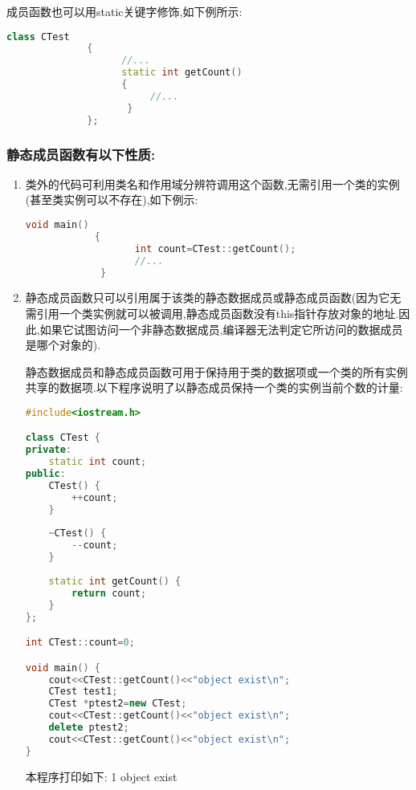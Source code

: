 \documentclass{article}
\begin{document}
成员函数也可以用static关键字修饰,如下例所示:
\begin{lstlisting}[language=c++]
              class CTest
              {
                    //...
                    static int getCount()
                    {
                         //...
                     }
              };
\end{lstlisting}
\subsubsection{静态成员函数有以下性质:}
\label{sec-2-3-1}

\begin{enumerate}
\item 类外的代码可利用类名和作用域分辨符调用这个函数,无需引用一个类的实例(甚至类实例可以不存在),如下例示:
\label{sec-2-3-1-1}
\begin{lstlisting}[language=c++]
            void main()
            {
                   int count=CTest::getCount();
                   //...
             }
\end{lstlisting}

\item 静态成员函数只可以引用属于该类的静态数据成员或静态成员函数(因为它无需引用一个类实例就可以被调用,静态成员函数没有this指针存放对象的地址.因此,如果它试图访问一个非静态数据成员,编译器无法判定它所访问的数据成员是哪个对象的).
\label{sec-2-3-1-2}

静态数据成员和静态成员函数可用于保持用于类的数据项或一个类的所有实例共享的数据项.以下程序说明了以静态成员保持一个类的实例当前个数的计量:
\begin{lstlisting}[language=c++]
#include<iostream.h>

class CTest {
private:
    static int count;
public:
    CTest() {    
        ++count;
    }
    
    ~CTest() {    
        --count;
    }
    
    static int getCount() {          
        return count;
    }
};

int CTest::count=0;

void main() {
    cout<<CTest::getCount()<<"object exist\n";
    CTest test1; 
    CTest *ptest2=new CTest;
    cout<<CTest::getCount()<<"object exist\n";
    delete ptest2;
    cout<<CTest::getCount()<<"object exist\n";
}
\end{lstlisting}
本程序打印如下:
          1 object exist
\end{enumerate}
\end{document}
